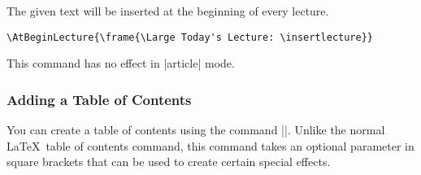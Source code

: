 
\begin{command}{\AtBeginLecture{}}
  The given text will be inserted at the beginning of every
  lecture.
  
  \example
\begin{verbatim}
\AtBeginLecture{\frame{\Large Today's Lecture: \insertlecture}}
\end{verbatim}

  \articlenote
  This command has no effect in |article| mode.
\end{command}


\subsubsection{Adding a Table of Contents}

You can create a table of contents using the command
|\tableofcontents|. Unlike the normal \LaTeX\ table of contents
command, this command takes an optional parameter in square brackets
that can be used to create certain special effects.

